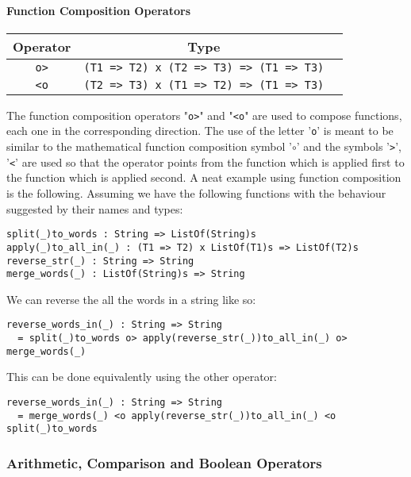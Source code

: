 \documentclass{article}
\begin{document}
\paragraph{Function Composition Operators}
\begin{center}
\begin{tabular}{ |c|c|c| }
\hline
Operator & Type
\\
\hline
\hline
\verb|o>| & \verb|(T1 => T2) x (T2 => T3) => (T1 => T3)|
\\
\hline
\verb|<o| & \verb|(T2 => T3) x (T1 => T2) => (T1 => T3)|
\\
\hline
\end{tabular}
\end{center}
The function composition operators "\verb|o>|" and "\verb|<o|" are used to
compose functions, each one in the corresponding direction. The use of the
letter '\verb|o|' is meant to be similar to the mathematical function
composition symbol '\(\circ\)' and the symbols '\verb|>|', '\verb|<|' are used
so that the operator points from the function which is applied first to the
function which is applied second.  A neat example using function composition is
the following. Assuming we have the following functions with the behaviour
suggested by their names and types:
\begin{verbatim}
split(_)to_words : String => ListOf(String)s
apply(_)to_all_in(_) : (T1 => T2) x ListOf(T1)s => ListOf(T2)s
reverse_str(_) : String => String
merge_words(_) : ListOf(String)s => String
\end{verbatim}
We can reverse the all the words in a string like so:
\begin{verbatim}
reverse_words_in(_) : String => String
  = split(_)to_words o> apply(reverse_str(_))to_all_in(_) o> merge_words(_)
\end{verbatim}
This can be done equivalently using the other operator:
\begin{verbatim}
reverse_words_in(_) : String => String
  = merge_words(_) <o apply(reverse_str(_))to_all_in(_) <o split(_)to_words
\end{verbatim}

\newpage

\subsubsection{Arithmetic, Comparison and Boolean Operators}
\end{document}
